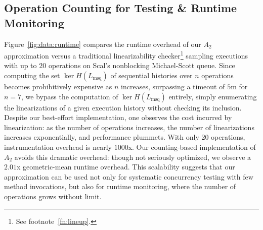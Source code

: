 \subsection{Operation Counting for Testing \& Runtime Monitoring}
\label{sec:exp:dynamic}

Figure~\ref{fig:data:runtime} compares the runtime overhead of our $A_2$
approximation versus a traditional linearizability checker\footnote{See
footnote~\ref{fn:lineup}.} sampling executions with up to $20$ operations on
Scal's nonblocking Michael-Scott queue. Since computing the set $\ker
H(L_\mathrm{msq})$ of sequential histories over $n$ operations becomes
prohibitively expensive as $n$ increases, surpassing a timeout of $5$m for
$n\!=\!7$, we bypass the computation of $\ker H(L_\mathrm{msq})$ entirely,
simply enumerating the linearizations of a given execution history without
checking its inclusion. Despite our best-effort implementation, one observes
the cost incurred by linearization: as the number of operations increases, the
number of linearizations increases exponentially, and performance plummets.
With only 20 operations, instrumentation overhead is nearly $1000$x. Our
counting-based implementation of $A_2$ avoids this dramatic overhead: though
not seriously optimized, we observe a $2.01$x geometric-mean runtime overhead.
This scalability suggests that our approximation can be used not only for
systematic concurrency testing with few method invocations, but also for
runtime monitoring, where the number of operations grows without limit.

